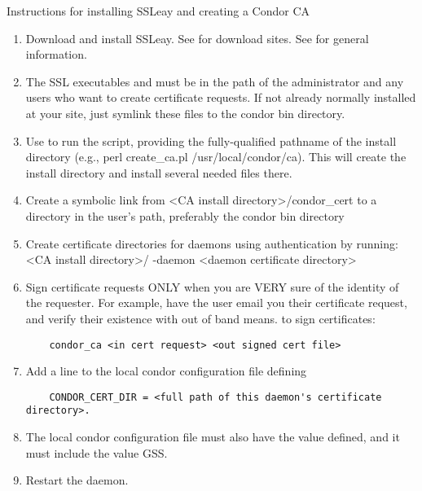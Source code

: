 Instructions for installing SSLeay and creating a Condor CA
\begin{enumerate}
\item Download and install SSLeay. See  for download sites. See  for general information.

\item The SSL executables  and  must be in the path of the administrator and any users who want to create certificate requests. If not already normally installed at your site, just symlink these files to the condor bin directory.

\item Use  to run the  script, providing the fully-qualified pathname of the install directory (e.g., perl create\_ca.pl /usr/local/condor/ca).
This will create the install directory and install several needed files there.

\item Create a symbolic link from <CA install directory>/condor\_cert to a directory in the user's path, preferably the condor bin directory

\item Create certificate directories for daemons using authentication by running: <CA install directory>/ -daemon <daemon certificate directory>

\item Sign certificate requests ONLY when you are VERY sure of the identity
of the requester. For example, have the user email you their certificate
request, and verify their existence with out of band means.
to sign certificates: 
\begin{verbatim}
	condor_ca <in cert request> <out signed cert file>
\end{verbatim}

\item Add a line to the local condor configuration file defining
\begin{verbatim}
	CONDOR_CERT_DIR = <full path of this daemon's certificate directory>.
\end{verbatim}

\item The local condor configuration file must also have the  value defined, and it must include the value GSS.

\item Restart the daemon.
\end{enumerate}


